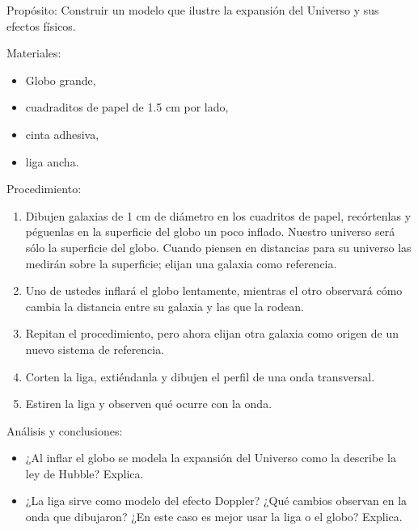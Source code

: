 \documentclass[12pt,addpoints]{guia}
\begin{document}
\begin{card}
    Propósito:
    Construir un modelo que ilustre la expansión del Universo y sus
    efectos físicos.

    Materiales:
    \begin{itemize}
        \item Globo grande,
        \item cuadraditos de papel de 1.5 cm por lado,
        \item cinta adhesiva,
        \item liga ancha.
    \end{itemize}

    Procedimiento:
    \begin{enumerate}
        \item Dibujen galaxias de 1 cm de diámetro en los cuadritos de papel, recórtenlas y
              péguenlas en la superficie del globo un poco inflado. Nuestro universo será
              sólo la superficie del globo. Cuando piensen en distancias para su universo las
              medirán sobre la superficie; elijan una galaxia como referencia.
        \item Uno de ustedes inflará el globo lentamente, mientras el otro observará cómo
              cambia la distancia entre su galaxia y las que la rodean.
        \item Repitan el procedimiento, pero ahora elijan otra galaxia como origen de un
              nuevo sistema de referencia.
        \item Corten la liga, extiéndanla y dibujen el perfil de una onda transversal.
        \item Estiren la liga y observen qué ocurre con la onda.
    \end{enumerate}


    Análisis y conclusiones:
    \begin{itemize}
    \item ¿Al inflar el globo se modela la expansión del Universo como la describe la ley
        de Hubble? Explica.
        \item ¿La liga sirve como modelo del efecto Doppler? ¿Qué cambios observan en la
        onda que dibujaron? ¿En este caso es mejor usar la liga o el globo? Explica.
    \end{itemize}
\end{card}
\begin{questions}
    \questionboxed[50]{}
    \questionboxed[50]{}
\end{questions}
\end{document}
